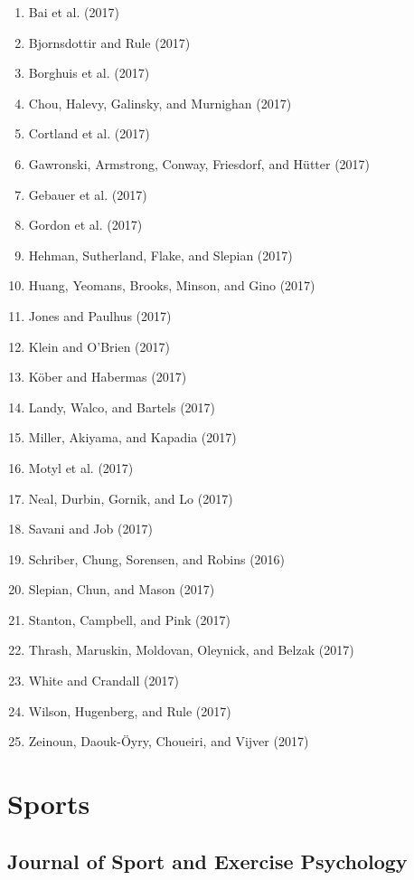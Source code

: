 \documentclass[english,man]{apa6}
\providecommand{\tightlist}{%
  \setlength{\itemsep}{0pt}\setlength{\parskip}{0pt}}
\theoremstyle{definition}
\theoremstyle{definition}
\theoremstyle{definition}
\theoremstyle{remark}
\begin{document}
\begin{enumerate}
\def\labelenumi{\arabic{enumi})}
\tightlist
\item
  Bai et al. (2017)
\item
  Bjornsdottir and Rule (2017)
\item
  Borghuis et al. (2017)
\item
  Chou, Halevy, Galinsky, and Murnighan (2017)
\item
  Cortland et al. (2017)
\item
  Gawronski, Armstrong, Conway, Friesdorf, and Hütter (2017)
\item
  Gebauer et al. (2017)
\item
  Gordon et al. (2017)
\item
  Hehman, Sutherland, Flake, and Slepian (2017)
\item
  Huang, Yeomans, Brooks, Minson, and Gino (2017)
\item
  Jones and Paulhus (2017)
\item
  Klein and O'Brien (2017)
\item
  Köber and Habermas (2017)
\item
  Landy, Walco, and Bartels (2017)
\item
  Miller, Akiyama, and Kapadia (2017)
\item
  Motyl et al. (2017)
\item
  Neal, Durbin, Gornik, and Lo (2017)
\item
  Savani and Job (2017)
\item
  Schriber, Chung, Sorensen, and Robins (2016)
\item
  Slepian, Chun, and Mason (2017)
\item
  Stanton, Campbell, and Pink (2017)
\item
  Thrash, Maruskin, Moldovan, Oleynick, and Belzak (2017)
\item
  White and Crandall (2017)
\item
  Wilson, Hugenberg, and Rule (2017)
\item
  Zeinoun, Daouk-Öyry, Choueiri, and Vijver (2017)
\end{enumerate}

\section{Sports}\label{sports}

\subsection{Journal of Sport and Exercise
Psychology}\label{journal-of-sport-and-exercise-psychology}
\end{document}
